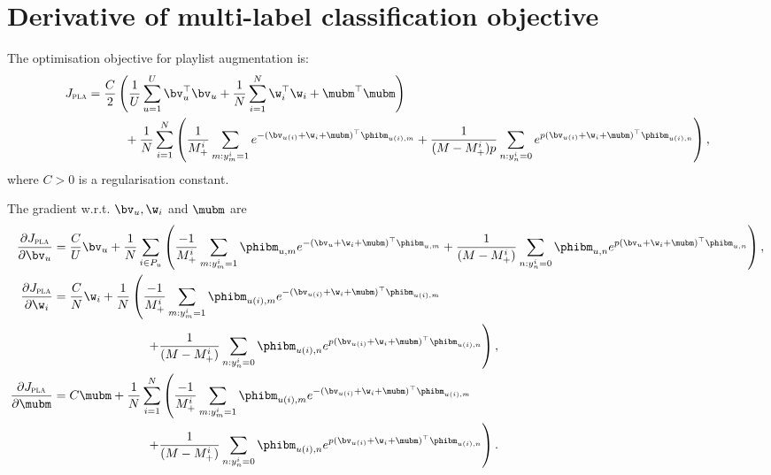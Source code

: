 \section{Derivative of multi-label classification objective}

The optimisation objective for playlist augmentation is:
\begin{equation*}
\begin{aligned}
J_\textsc{pla} &= \frac{C}{2} \left( \frac{1}{U} \sum_{u=1}^U \bv_u^\top \bv_u 
     + \frac{1}{N} \sum_{i=1}^N \w_i^\top \w_i + \mubm^\top \mubm \right) \\
& \hspace{3em}
     + \frac{1}{N} \sum_{i=1}^N \left( \frac{1}{M_+^i} \sum_{m: y_m^i = 1} e^{-(\bv_{u(i)} + \w_i + \mubm)^\top \phibm_{u(i),m}} 
     + \frac{1}{(M - M_+^i) p} \sum_{n: y_n^i = 0} e^{p (\bv_{u(i)} + \w_i + \mubm)^\top \phibm_{u(i),n}} \right),
\end{aligned}
\end{equation*}
where $C > 0$ is a regularisation constant.

The gradient w.r.t. $\bv_u, \w_i$ and $\mubm$ are
\begin{equation*}
\begin{aligned}
\frac{\partial J_\textsc{pla}}{\partial \bv_u}
&= \frac{C}{U} \bv_u + \frac{1}{N} \sum_{i \in P_u} \left( 
   \frac{-1}{M_+^i} \sum_{m: y_m^i = 1} \phibm_{u,m} e^{-(\bv_{u} + \w_i + \mubm)^\top \phibm_{u,m}}
   + \frac{1}{(M - M_+^i)} \sum_{n: y_n^i = 0} \phibm_{u,n} e^{p (\bv_{u} + \w_i + \mubm)^\top \phibm_{u,n}} \right), \\
\frac{\partial J_\textsc{pla}}{\partial \w_i}
&= \frac{C}{N} \w_i + \frac{1}{N} \left( 
   \frac{-1}{M_+^i} \sum_{m: y_m^i = 1} \phibm_{u(i),m} e^{-(\bv_{u(i)} + \w_i + \mubm)^\top \phibm_{u(i),m}} \right. \\
& \hspace{7.5em} \left.
   + \frac{1}{(M - M_+^i)} \sum_{n: y_n^i = 0} \phibm_{u(i),n} e^{p (\bv_{u(i)} + \w_i + \mubm)^\top \phibm_{u(i),n}} \right), \\
\frac{\partial J_\textsc{pla}}{\partial \mubm}
&= C \mubm + \frac{1}{N} \sum_{i=1}^N \left( 
   \frac{-1}{M_+^i} \sum_{m: y_m^i = 1} \phibm_{u(i),m} e^{-(\bv_{u(i)} + \w_i + \mubm)^\top \phibm_{u(i),m}} \right. \\
& \hspace{7.5em} \left.
   + \frac{1}{(M - M_+^i)} \sum_{n: y_n^i = 0} \phibm_{u(i),n} e^{p (\bv_{u(i)} + \w_i + \mubm)^\top \phibm_{u(i),n}} \right).
\end{aligned}
\end{equation*}


